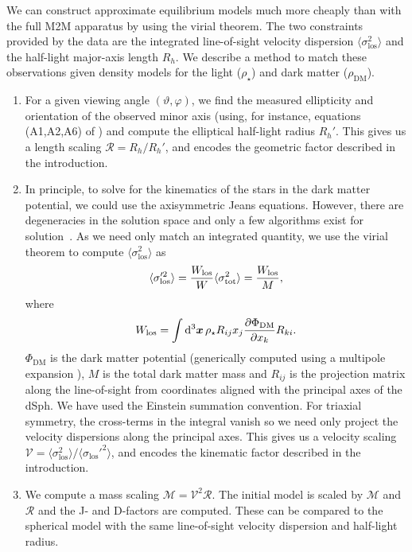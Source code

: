 \documentclass[prd,twocolumn,showpacs,preprintnumbers,superscriptaddress,nofootinbib,amsmath,amssymb,nobalancelastpage]{revtex4}
\begin{document}
We can construct approximate equilibrium models much more cheaply than
with the full M2M apparatus by using the virial theorem. The two constraints
provided by the data are the integrated line-of-sight velocity
dispersion ${\langle\sigma_\mathrm{los}^2\rangle}$ and the half-light major-axis length $R_h$. We describe a method to match these
observations given density models for the light ($\rho_\star$) and dark matter ($\rho_{\mathrm{DM}}$).

\begin{enumerate}
\item For a given viewing angle $(\vartheta,\varphi)$, we find the
  measured ellipticity and orientation of the observed minor axis  (using, for instance, equations (A1,A2,A6) of \cite{Weijmans2014})  and
  compute the elliptical half-light radius $R_h'$. This gives us a
  length scaling $\mathcal{R} = R_h/R_h'$, and encodes the geometric factor described in the introduction.

\item In principle, to solve for the kinematics of the stars in the
  dark matter potential, we could use the axisymmetric Jeans
  equations. However, there are degeneracies in the solution space and
  only a few algorithms exist for solution~\citep{Ca08,Ev15}. As we need only
  match an integrated quantity, we use the virial theorem to compute $\langle\sigma_\mathrm{los}^2\rangle$ as
%
\begin{equation}
\langle\sigma_\mathrm{los}'^2\rangle ={W_{\rm los} \over W} \langle\sigma_\mathrm{tot}^2\rangle = {W_{\rm los} \over M},
\end{equation}
where
\begin{equation}
W_{\rm los} = \int\mathrm{d}^3\boldsymbol{x}\,\rho_\star R_{ij} x_j
\frac{\partial\Phi_{\mathrm{DM}}} {\partial x_k} R_{ki}.
\end{equation}
$\Phi_{\mathrm{DM}}$ is the dark matter potential (generically computed using a multipole expansion \cite{BT}), $M$ is the total dark matter mass and $R_{ij}$ is the projection matrix along the line-of-sight from coordinates aligned with the principal axes of the dSph. We have used the Einstein summation convention. For triaxial symmetry, the cross-terms in the integral vanish so we need only project the velocity dispersions along the principal axes. This gives us a
  velocity scaling $\mathcal{V} = \langle\sigma_\mathrm{los}^2\rangle/\langle\sigma_\mathrm{los}'^2\rangle$, and encodes the kinematic factor described in the introduction.

\item We compute a mass scaling $\mathcal{M}=\mathcal{V}^2\mathcal{R}$. The initial
  model is scaled by $\mathcal{M}$ and $\mathcal{R}$ and the J- and
  D-factors are computed. These can be compared to the spherical model
  with the same line-of-sight velocity dispersion and half-light
  radius.

\end{enumerate}
\end{document}
